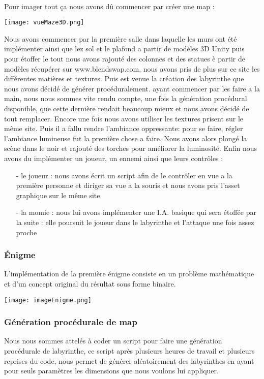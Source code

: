 \documentclass[12pt,a4paper]{article}
\begin{document}
\paragraph{}
Pour imager tout ça nous avons dû commencer par créer une map :
\begin{center}
\texttt{[image: vueMaze3D.png]}
\end{center}

Nous avons commencer par la première salle dans laquelle les murs ont été implémenter ainsi que lez sol et le plafond a partir de modèles 3D Unity puis pour étoffer le tout nous avons rajouté des colonnes et des statues è partir de modèles récupérer sur www.blendswap.com, nous avons pris de plus sur ce site les différentes matières et textures. Puis est venue la création des labyrinthe que nous avons décidé de générer procéduralement. ayant commencer par les faire a la main, nous nous sommes vite rendu compte, une fois la génération procédural disponible, que cette dernière rendait beaucoup mieux et nous avons décidé de tout remplacer. Encore une fois nous avons utiliser les textures prisent sur le même site.
Puis il a fallu rendre l'ambiance oppressante: pour se faire, régler l'ambiance lumineuse fut la première chose a faire. Nous avons alors plongé la scène dans le noir et rajouté des torches pour améliorer la luminosité.
Enfin nous avons du implémenter un joueur, un ennemi ainsi que leurs contrôles :
\begin{itemize}
\item[-] le joueur : nous avons écrit un script afin de le contrôler en vue a la première personne et diriger sa vue a la souris et nous avons pris l'asset graphique sur le même site
\item[-] la momie : nous lui avons implémenter une I.A. basique qui sera étoffée par la suite : elle poursuit le joueur dans le labyrinthe et l'attaque une fois assez proche
\end{itemize} 

\newpage
\subsubsection{Énigme}
L'implémentation de la première énigme consiste en un problème mathématique et d'un concept original du résultat sous forme binaire.
\begin{center}
\texttt{[image: imageEnigme.png]}
\end{center}

\subsubsection{Génération procédurale de map}
Nous nous sommes attelés à coder un script pour faire une génération procédurale de labyrinthe, ce script après plusieurs heures de travail et plusieurs reprises du code, nous permet de générer aléatoirement des labyrinthes en ayant pour seuls paramètres les dimensions que nous voulons lui appliquer.
\end{document}
